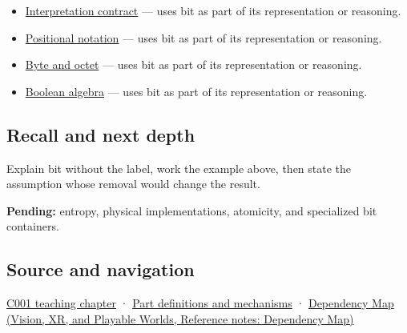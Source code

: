 \begin{itemize}
\tightlist
\item
  \hyperref[appendix-f414bd4ed05c]{Interpretation contract} --- uses bit as part of its representation or reasoning.
\item
  \hyperref[appendix-83c3f28f7bda]{Positional notation} --- uses bit as part of its representation or reasoning.
\item
  \hyperref[appendix-5bee2df85484]{Byte and octet} --- uses bit as part of its representation or reasoning.
\item
  \hyperref[appendix-24475e1596a8]{Boolean algebra} --- uses bit as part of its representation or reasoning.
\end{itemize}

\subsection{Recall and next depth}\label{appendix-ddbb69998a2e-recall-and-next-depth}

\hypertarget{appendix-ddbb69998a2e-recall-and-next-depth}{}

Explain bit without the label, work the example above, then state the assumption whose removal would change the result.

\textbf{Pending:} entropy, physical implementations, atomicity, and specialized bit containers.

\subsection{Source and navigation}\label{appendix-ddbb69998a2e-source-and-navigation}

\hypertarget{appendix-ddbb69998a2e-source-and-navigation}{}

\hyperref[01-foundations-i-ch001-from-a-signal-to-an-interpretation]{C001 teaching chapter} · \hyperref[appendix-fd090d982a15]{Part definitions and mechanisms} · \href{../07-Vision-XR-and-Playable-Worlds/main.pdf\#nameddest=appendix-4ad47bdd269a}{Dependency Map (Vision, XR, and Playable Worlds, Reference notes: Dependency Map)}
